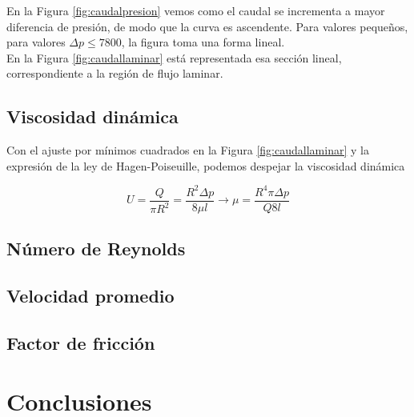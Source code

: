 \documentclass[a4paper,12pt,spanish]{article}
\begin{document}
	En la Figura \ref{fig:caudalpresion} vemos como el caudal se incrementa a mayor diferencia de presión, de modo que la curva es ascendente. Para valores pequeños, para valores $\mathit{\Delta }p \leq 7800$, la figura toma una forma lineal.\\
	
	En la Figura \ref{fig:caudallaminar} está representada esa sección lineal, correspondiente a la región de flujo laminar.
	
	\subsection*{Viscosidad dinámica}
	
	
	Con el ajuste por mínimos cuadrados en la Figura \ref{fig:caudallaminar} y la expresión de la ley de Hagen-Poiseuille, podemos despejar la viscosidad dinámica
	
	
	\[U = \frac{Q}{\pi R^2} = \frac{R^2 \mathit{\Delta} p}{8\mu l} \longrightarrow \mu = \frac{R^4\pi \mathit{\Delta p}}{Q 8 l}
	\] 
	
	
	\subsection*{Número de Reynolds}
	
	
	
	\subsection*{Velocidad promedio}
	
	\subsection*{Factor de fricción}
	
	
	
	
	\section{Conclusiones}
	
	
	
	
\end{document}
